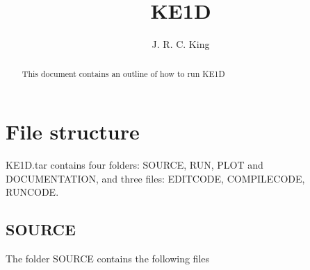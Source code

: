 \documentclass{article}
\begin{document}
\title{KE1D}
\author{J. R. C. King}
\maketitle
\begin{abstract}
This document contains an outline of how to run KE1D
\end{abstract}


\section{File structure}
KE1D.tar contains four folders: SOURCE, RUN, PLOT and DOCUMENTATION, and three files: EDITCODE, COMPILECODE, RUNCODE.

\subsection{SOURCE}
The folder SOURCE contains the following files
\end{document}
